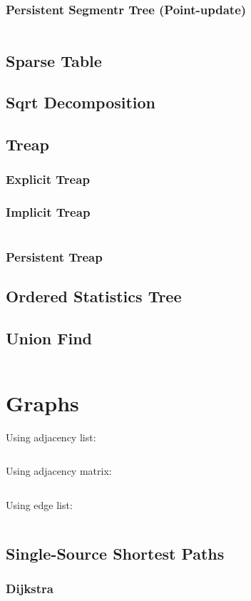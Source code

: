 \documentclass[8pt,a4paper,landscape,oneside]{amsart}
\newcommand{\code}[1]{\inputminted[fontsize=\normalsize,baselinestretch=1]{cpp}{_code/#1}}
\begin{document}
\begin{multicols*}{3}
		\subsubsection{Persistent Segmentr Tree (Point-update)}
			\code{data-structures/segtree_persistent.cpp}
	\subsection{Sparse Table}
	\subsection{Sqrt Decomposition}
	\subsection{Treap}
		\subsubsection{Explicit Treap}
		\subsubsection{Implicit Treap}
			\code{data-structures/treap_implicit.cpp}
		\subsubsection{Persistent Treap}
	\subsection{Ordered Statistics Tree}
	\subsection{Union Find}
		\code{data-structures/union_find.cpp}
\section{Graphs}
	Using adjacency list:
	\code{graphs/graph_template_adjlist.cpp}
	Using adjacency matrix:
	\code{graphs/graph_template_adjmat.cpp}
	Using edge list:
	\code{graphs/graph_template_edgelist.cpp}
	\subsection{Single-Source Shortest Paths}
		\subsubsection{Dijkstra}
			\code{graphs/dijkstra.cpp}

\end{multicols*}
\end{document}
